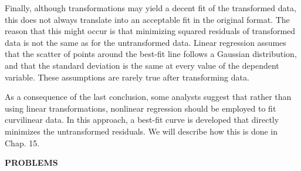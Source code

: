 \documentclass[../main.tex]{subfiles}
\begin{document}
Finally, although transformations may yield a decent fit of the transformed data, this does not always translate into an acceptable fit in the original format. The reason that this might occur is that minimizing squared residuals of transformed data is not the same as for the untransformed data. Linear regression assumes that the scatter of points around the best-fit line follows a Gaussian distribution,  and that the standard deviation is the same at every value of the dependent variable. These assumptions are rarely true after transforming data. 

As a consequence of the last conclusion, some analysts suggest that rather than using linear transformations, nonlinear regression should be employed to fit curvilinear data. In this approach, a best-fit curve is developed that directly minimizes the untransformed residuals. We will describe how this is done in Chap. 15.


\bigskip
\noindent\textbf{PROBLEMS}\\
\end{document}
